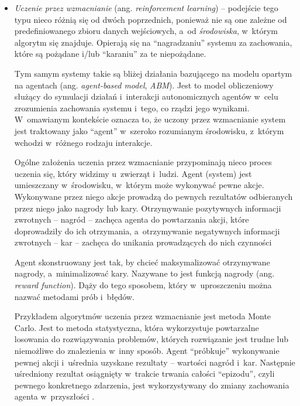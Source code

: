 {\begin{itemize}
  \item \emph{Uczenie przez wzmacnianie} (ang. \emph{reinforcement learning}) --
        podejście tego typu nieco różnią się od dwóch poprzednich, ponieważ nie są one zależne od predefiniowanego zbioru danych wejściowych, a~od \emph{środowiska}, w~którym algorytm się znajduje.
        Opierają się na ``nagradzaniu'' systemu za zachowania, które są pożądane i/lub ``karaniu'' za te niepożądane.

        Tym samym systemy takie są bliżej działania bazującego na modelu opartym na agentach (ang. \emph{agent-based model}, \emph{ABM}).
        Jest to model obliczeniowy służący do symulacji działań i~interakcji autonomicznych agentów w~celu zrozumienia zachowania systemu i~tego, co rządzi jego wynikami.
        W~omawianym kontekście oznacza to, że uczony przez wzmacnianie system jest traktowany jako ``agent'' w~szeroko rozumianym środowisku, z~którym wchodzi w~różnego rodzaju interakcje.

        Ogólne założenia uczenia przez wzmacnianie przypominają nieco proces uczenia się, który widzimy u~zwierząt i~ludzi.
        Agent (system) jest umieszczany w~środowisku, w~którym może wykonywać pewne akcje.
        Wykonywane przez niego akcje prowadzą do pewnych rezultatów odbieranych przez niego jako nagrody lub kary.
        Otrzymywanie pozytywnych informacji zwrotnych -- nagród -- zachęca agenta do powtarzania akcji, które doprowadziły do ich otrzymania, a~otrzymywanie negatywnych informacji zwrotnych -- kar -- zachęca do unikania prowadzących do nich czynności

        Agent skonstruowany jest tak, by chcieć maksymalizować otrzymywane nagrody, a~minimalizować kary.
        Nazywane to jest funkcją nagrody (ang. \emph{reward function}).
        Dąży do tego sposobem, który w~uproszczeniu można nazwać metodami prób i~błędów.

        Przykładem algorytmów uczenia przez wzmacnianie jest metoda Monte Carlo.
        Jest to metoda statystyczna, która wykorzystuje powtarzalne losowania do rozwiązywania problemów, których rozwiązanie jest trudne lub niemożliwe do znalezienia w~inny sposób.
        Agent ``próbkuje'' wykonywanie pewnej akcji i~uśrednia uzyskane rezultaty -- wartości nagród i~kar.
        Następnie uśredniony rezultat osiągnięty w~trakcie trwania całości ``epizodu'', czyli pewnego konkretnego zdarzenia, jest wykorzystywany do zmiany zachowania agenta w~przyszłości \cite{thrun2000reinforcement}.

\end{itemize}

}
